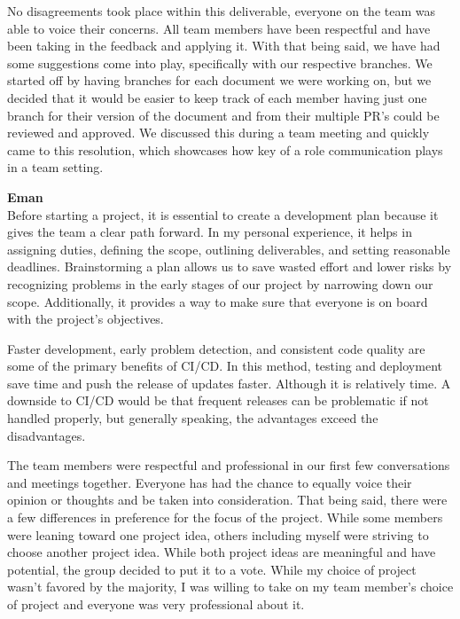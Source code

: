 \documentclass{article}
\begin{document}
No disagreements took place within this deliverable, everyone on the team was able to voice their concerns. All team members have been respectful and have been taking in the feedback and applying it. With that being said, we have had some suggestions come into play, specifically with our respective branches. We started off by having branches for each document we were working on, but we decided that it would be easier to keep track of each member having just one branch for their version of the document and from their multiple PR’s could be reviewed and approved. We discussed this during a team meeting and quickly came to this resolution, which showcases how key of a role communication plays in a team setting.

\textbf{Eman}\\

Before starting a project, it is essential to create a development plan because it gives the team a clear path forward. In my personal experience, it helps in assigning duties, defining the scope, outlining deliverables, and setting reasonable deadlines. Brainstorming a plan allows us to save wasted effort and lower risks by recognizing problems in the early stages of our project by narrowing down our scope. Additionally, it provides a way to make sure that everyone is on board with the project's objectives. 

Faster development, early problem detection, and consistent code quality are some of the primary benefits of CI/CD. In this method, testing and deployment save time and push the release of updates faster. Although it is relatively time. A downside to CI/CD would be that frequent releases can be problematic if not handled properly, but generally speaking, the advantages exceed the disadvantages.

The team members were respectful and professional in our first few conversations and meetings together. Everyone has had the chance to equally voice their opinion or thoughts and be taken into consideration. That being said, there were a few differences in preference for the focus of the project. While some members were leaning toward one project idea, others including myself were striving to choose another project idea. While both project ideas are meaningful and have potential, the group decided to put it to a vote. While my choice of project wasn’t favored by the majority, I was willing to take on my team member’s choice of project and everyone was very professional about it. \\
\end{document}
